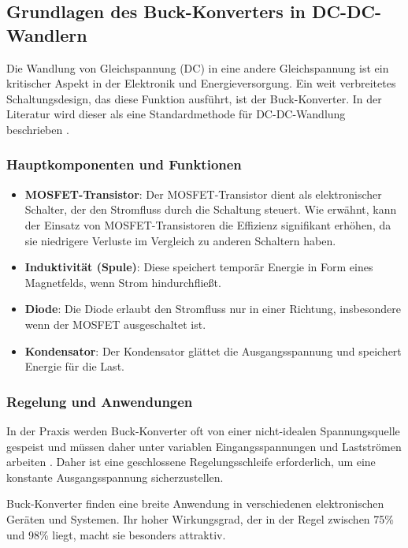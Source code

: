 \subsection{Grundlagen des Buck-Konverters in DC-DC-Wandlern}

Die Wandlung von Gleichspannung (DC) in eine andere Gleichspannung ist ein kritischer Aspekt in der Elektronik und Energieversorgung. Ein weit verbreitetes Schaltungsdesign, das diese Funktion ausführt, ist der Buck-Konverter. In der Literatur wird dieser als eine Standardmethode für DC-DC-Wandlung beschrieben \cite{Luo2004}.

\subsubsection{Hauptkomponenten und Funktionen}

\begin{itemize}
    \item \textbf{MOSFET-Transistor}: Der MOSFET-Transistor dient als elektronischer Schalter, der den Stromfluss durch die Schaltung steuert. Wie erwähnt, kann der Einsatz von MOSFET-Transistoren die Effizienz signifikant erhöhen, da sie niedrigere Verluste im Vergleich zu anderen Schaltern haben.
    \item \textbf{Induktivität (Spule)}: Diese speichert temporär Energie in Form eines Magnetfelds, wenn Strom hindurchfließt.
    \item \textbf{Diode}: Die Diode erlaubt den Stromfluss nur in einer Richtung, insbesondere wenn der MOSFET ausgeschaltet ist.
    \item \textbf{Kondensator}: Der Kondensator glättet die Ausgangsspannung und speichert Energie für die Last.
\end{itemize}

\subsubsection{Regelung und Anwendungen}

In der Praxis werden Buck-Konverter oft von einer nicht-idealen Spannungsquelle gespeist und müssen daher unter variablen Eingangsspannungen und Lastströmen arbeiten \cite{choi2013pulsewidth}. Daher ist eine geschlossene Regelungsschleife erforderlich, um eine konstante Ausgangsspannung sicherzustellen.

Buck-Konverter finden eine breite Anwendung in verschiedenen elektronischen Geräten und Systemen. Ihr hoher Wirkungsgrad, der in der Regel zwischen 75\% und 98\% liegt, macht sie besonders attraktiv.



